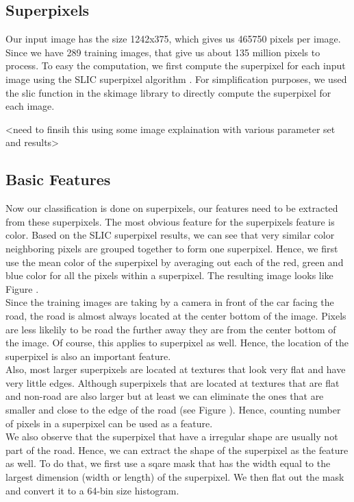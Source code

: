 \documentclass[paper=letter, fontsize=11pt]{scrartcl}
\numberwithin{equation}{section}		%
\numberwithin{figure}{section}			%
\numberwithin{table}{section}				%
\begin{document}
\subsection{Superpixels}
Our input image has the size 1242x375, which gives us 465750 pixels per image. Since we have 289 training images, that give us about 135 million pixels to process. To easy the computation, we first compute the superpixel for each input image using the SLIC superpixel algorithm \cite{bib:slic}. For simplification purposes, we used the slic function in the skimage library \cite{bib:skimage} to directly compute the superpixel for each image.

<need to finsih this using some image explaination with various parameter set and results>

\subsection{Basic Features}
Now our classification is done on superpixels, our features need to be extracted from these superpixels. The most obvious feature for the superpixels feature is color. Based on the SLIC superpixel results, we can see that very similar color neighboring pixels are grouped together to form one superpixel. Hence, we first use the mean color of the superpixel by averaging out each of the red, green and blue color for all the pixels within a superpixel. The resulting image looks like Figure \cite{fig:meanslic}. \\

Since the training images are taking by a camera in front of the car facing the road, the road is almost always located at the center bottom of the image. Pixels are less likelily to be road the further away they are from the center bottom of the image. Of course, this applies to superpixel as well. Hence, the location of the superpixel is also an important feature.\\ 

Also, most larger superpixels are located at textures that look very flat and have very little edges. Although superpixels that are located at textures that are flat and non-road are also larger but at least we can eliminate the ones that are smaller and close to the edge of the road (see Figure \cite{fig:smallsuperpixel}). Hence, counting number of pixels in a superpixel can be used as a feature.\\

We also observe that the superpixel that have a irregular shape  are usually not part of the road. Hence, we can extract the shape of the superpixel as the feature as well. To do that, we first use a sqare mask that has the width equal to the largest dimension (width or length) of the superpixel. We then flat out the mask and convert it to a 64-bin size histogram.  \\
\end{document}

